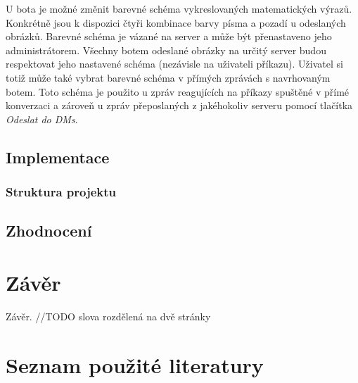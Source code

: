 \documentclass[FM]{tulthesis}
\begin{document}
	U bota je možné změnit barevné schéma vykreslovaných matematických výrazů. Konkrétně jsou k dispozici čtyři kombinace barvy písma a pozadí u odeslaných obrázků. Barevné schéma je vázané na server a může být přenastaveno jeho administrátorem. Všechny botem odeslané obrázky na určitý server budou respektovat jeho nastavené schéma (nezávisle na uživateli příkazu). Uživatel si totiž může také vybrat barevné schéma v přímých zprávách s navrhovaným botem. Toto schéma je použito u zpráv reagujících na příkazy spuštěné v přímé konverzaci a zároveň u zpráv přeposlaných z jakéhokoliv serveru pomocí tlačítka \textit{Odeslat do DMs}.
	
	\section{Implementace}
	
	\subsection{Struktura projektu}

	
	\section{Zhodnocení}
	
	
	\chapter{Závěr}
	
	Závěr. //TODO slova rozdělená na dvě stránky%
	
	\chapter*{Seznam použité literatury}
	\printbibliography[heading=none]
	
\end{document}
